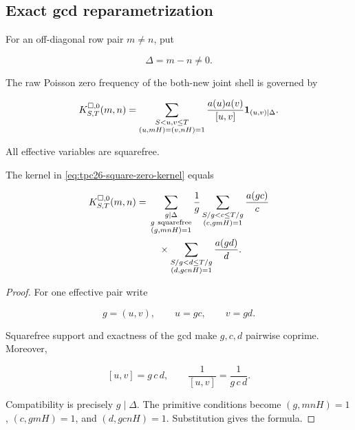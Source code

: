 \subsection{Exact gcd reparametrization}

For an off-diagonal row pair \(m\ne n\), put

\begin{equation}
 \Delta=m-n\ne0.
 \label{eq:tpc26-Delta}
\end{equation}

The raw Poisson zero frequency of the both-new joint shell is governed
by

\begin{equation}
 K^{\square,0}_{S,T}(m,n)
 =
 \sum_{\substack{S<u,v\le T\\
                  (u,mH)=(v,nH)=1}}
 \frac{a(u)a(v)}{[u,v]}
 \mathbf 1_{(u,v)\mid\Delta}.
 \label{eq:tpc26-square-zero-kernel}
\end{equation}

All effective variables are squarefree.

\begin{lemma}
\label{lem:tpc26-both-new-gcd}
The kernel in \eqref{eq:tpc26-square-zero-kernel} equals

\begin{align}
 K^{\square,0}_{S,T}(m,n)
 ={}&
 \sum_{\substack{g\mid\Delta\\g\ \mathrm{squarefree}\\
                  (g,mnH)=1}}
 \frac1g
 \sum_{\substack{S/g<c\le T/g\\(c,gmH)=1}}
 \frac{a(gc)}c
 \notag\\
 &\quad\times
 \sum_{\substack{S/g<d\le T/g\\(d,gcnH)=1}}
 \frac{a(gd)}d.
 \label{eq:tpc26-both-new-gcd}
\end{align}
\end{lemma}

\begin{proof}
For one effective pair write

\[
 g=(u,v),\qquad u=gc,\qquad v=gd.
\]

Squarefree support and exactness of the gcd make \(g,c,d\) pairwise
coprime.  Moreover,

\[
 [u,v]=g\,c\,d,
 \qquad
 \frac1{[u,v]}=\frac1{g\,c\,d}.
\]

Compatibility is precisely \(g\mid\Delta\).  The primitive conditions
become \((g,mnH)=1\), \((c,gmH)=1\), and
\((d,gcnH)=1\).  Substitution gives the formula.
\end{proof}

